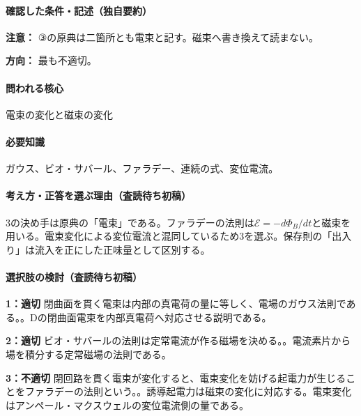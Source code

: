 \paragraph{確認した条件・記述（独自要約）}\mbox{}\par

\noindent\textbf{注意：} ③の原典は二箇所とも電束と記す。磁束へ書き換えて読まない。\par

\noindent\textbf{方向：} 最も不適切。\par

\paragraph{問われる核心} 電束の変化と磁束の変化

\paragraph{必要知識} ガウス、ビオ・サバール、ファラデー、連続の式、変位電流。

\paragraph{考え方・正答を選ぶ理由（査読待ち初稿）} 3の決め手は原典の「電束」である。ファラデーの法則は\(\mathcal E=-d\Phi_B/dt\)と磁束を用いる。電束変化による変位電流と混同しているため3を選ぶ。保存則の「出入り」は流入を正にした正味量として区別する。

\paragraph{選択肢の検討（査読待ち初稿）}\mbox{}\par

\noindent\textbf{1：適切} 閉曲面を貫く電束は内部の真電荷の量に等しく、電場のガウス法則である。。Dの閉曲面電束を内部真電荷へ対応させる説明である。\par

\noindent\textbf{2：適切} ビオ・サバールの法則は定常電流が作る磁場を決める。。電流素片から場を積分する定常磁場の法則である。\par

\noindent\textbf{3：不適切} 閉回路を貫く電束が変化すると、電束変化を妨げる起電力が生じることをファラデーの法則という。。誘導起電力は磁束の変化に対応する。電束変化はアンペール・マクスウェルの変位電流側の量である。\par

